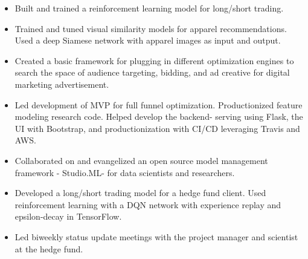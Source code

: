 \documentclass[11pt,a4paper,unicode]{moderncv}
\begin{document}
\vspace{-.1cm}
\cvline{}
{\begin{itemize} 
	  \item Built and trained a reinforcement learning model for long/short trading.
	  \item Trained and tuned visual similarity models for apparel recommendations. Used a deep Siamese network with apparel images as input and output. 
	  \item Created a basic framework for plugging in different optimization engines to search the space of audience targeting, bidding, and ad creative for digital marketing advertisement.  
	  \item Led development of MVP for full funnel optimization. Productionized feature modeling research code. Helped develop the backend- serving using Flask, the UI with Bootstrap, and productionization with CI/CD leveraging Travis and AWS. 
	  \item Collaborated on and evangelized an open source model management framework - Studio.ML- for data scientists and researchers.  
\end{itemize}}
\vspace{-.5cm}


\vspace{-.1cm}
\cvline{}
{\begin{itemize} 
	  \item Developed a long/short trading model for a hedge fund client. Used reinforcement learning with a DQN network with experience replay and epsilon-decay in TensorFlow. 
	  \item Led biweekly status update meetings with the project manager and scientist at the hedge fund.
\end{itemize}}
\vspace{-.5cm}
\end{document}
